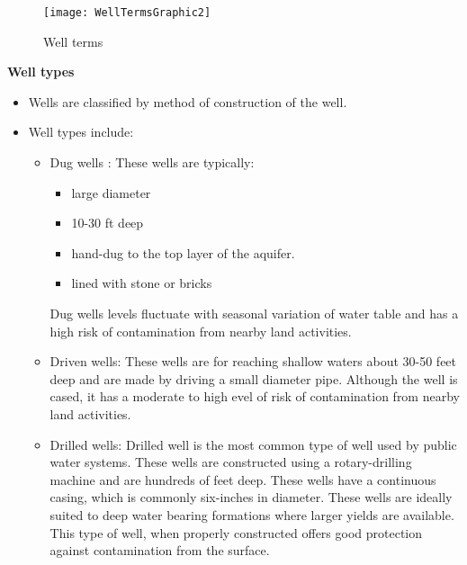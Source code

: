 \begin{figure}[!htb]
    \centering
    \begin{minipage}{0.8\textwidth}
        \centering
        \texttt{[image: WellTermsGraphic2]}
        \caption{Well terms}
        \label{Well terms}
    \end{minipage}%
    \end{figure}


\textbf{Well types} 
\begin{itemize}
\item Wells are classified by method of construction of the well.
\item Well types include:
\begin{itemize}
\item Dug wells :  These wells are typically:
\begin{itemize}
\item large diameter
\item 10-30 ft deep
\item hand-dug to the top layer of the aquifer.  
\item lined with stone or bricks
\end{itemize}
Dug wells levels fluctuate with seasonal variation of water table and has a high risk of contamination from nearby land activities.

\item Driven wells:  These wells are for reaching shallow waters about 30-50 feet deep and are made by driving a small diameter pipe.  Although the well is cased, it has a moderate to high evel of risk of contamination from nearby land activities.

\item Drilled wells:  Drilled well is the most common type of well used by public water systems.  These wells are constructed using a rotary-drilling machine and are hundreds of feet deep.  These wells have a continuous casing, which is commonly six-inches in diameter.  These wells are ideally suited to deep water bearing formations where larger yields are available. This type of well, when properly constructed offers good protection against contamination from the surface.
\end{itemize}

\end{itemize}

